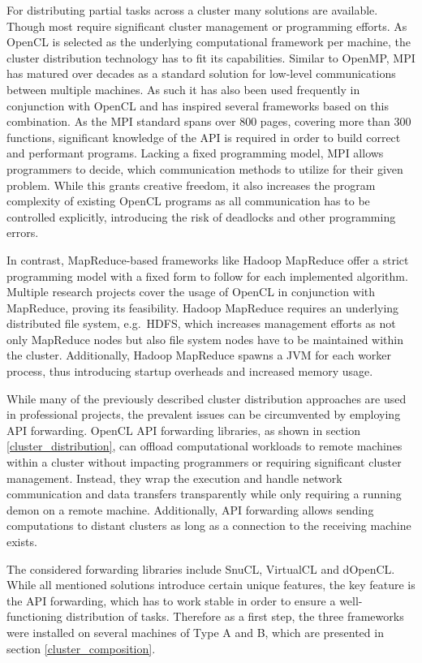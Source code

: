 For distributing partial tasks across a cluster many solutions are available. Though most require significant cluster management or programming efforts. As OpenCL is selected as the underlying computational framework per machine, the cluster distribution technology has to fit its capabilities.
Similar to OpenMP, MPI has matured over decades as a standard solution for low-level communications between multiple machines. As such it has also been used frequently in conjunction with OpenCL and has inspired several frameworks based on this combination\cite{mpi-acc}\cite{starpu}. As the MPI standard spans over 800 pages, covering more than 300 functions\cite{mpi_spec}, significant knowledge of the API is required in order to build correct and performant programs. Lacking a fixed programming model, MPI allows programmers to decide, which communication methods to utilize for their given problem. While this grants creative freedom, it also increases the program complexity of existing OpenCL programs as all communication has to be controlled explicitly, introducing the risk of deadlocks and other programming errors.

In contrast, MapReduce-based frameworks like Hadoop MapReduce offer a strict programming model with a fixed form to follow for each implemented algorithm. Multiple research projects cover the usage of OpenCL in conjunction with MapReduce, proving its feasibility\cite{hadoopcl}\cite{hadoop+}. Hadoop MapReduce requires an underlying distributed file system, e.g.~HDFS, which increases management efforts as not only MapReduce nodes but also file system nodes have to be maintained within the cluster. Additionally, Hadoop MapReduce spawns a JVM for each worker process, thus introducing startup overheads and increased memory usage.

While many of the previously described cluster distribution approaches are used in professional projects, the prevalent issues can be circumvented by employing API forwarding. OpenCL API forwarding libraries, as shown in section \ref{cluster_distribution}, can offload computational workloads to remote machines within a cluster without impacting programmers or requiring significant cluster management. Instead, they wrap the execution and handle network communication and data transfers transparently while only requiring a running demon on a remote machine. Additionally, API forwarding allows sending computations to distant clusters as long as a connection to the receiving machine exists.

The considered forwarding libraries include SnuCL, VirtualCL and dOpenCL. While all mentioned solutions introduce certain unique features, the key feature is the API forwarding, which has to work stable in order to ensure a well-functioning distribution of tasks. Therefore as a first step, the three frameworks were installed on several machines of Type A and B, which are presented in section \ref{cluster_composition}.

